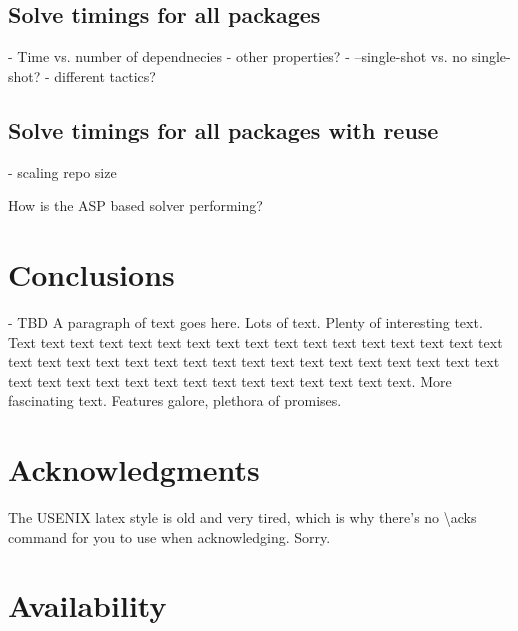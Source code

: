 \subsection{Solve timings for all packages}













- Time vs. number of dependnecies
- other properties?
- --single-shot vs. no single-shot?
- different tactics?

\subsection{Solve timings for all packages with reuse}
- scaling repo size


How is the ASP based solver performing?

\section{Conclusions}
- TBD
A paragraph of text goes here. Lots of text. Plenty of interesting
text. Text text text text text text text text text text text text text
text text text text text text text text text text text text text text
text text text text text text text text text text text text text text
text text text text text text text.
More fascinating text. Features galore, plethora of promises.

\section*{Acknowledgments}
The USENIX latex style is old and very tired, which is why
there's no \textbackslash{}acks command for you to use when
acknowledging. Sorry.

\section*{Availability}

